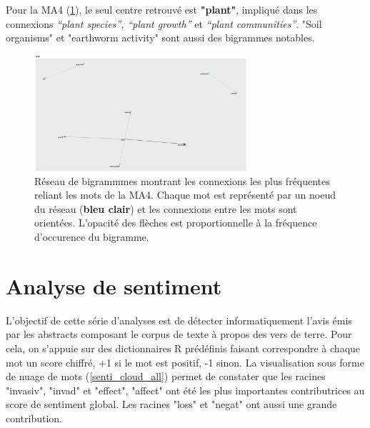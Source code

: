 \documentclass{book}
\begin{document}
Pour la MA4 (\cref{network4}), le seul centre retrouvé est \textbf{"plant"}, impliqué dans les connexions \textit{“plant species”, “plant growth”} et \textit{ “plant communities”}. "Soil organisms" et "earthworm activity" sont aussi des bigrammes notables.

\begin{figure}[htb] %
    \begin{center} %
        \includegraphics[width=0.7\textwidth]{network4.png}
        \caption{Réseau de bigrammmes montrant les connexions les plus fréquentes reliant les mots de la MA4. Chaque mot est représenté par un noeud du réseau (\textbf{bleu clair}) et les connexions entre les mots sont orientées. L’opacité des flèches est proportionnelle à la fréquence d’occurence du bigramme.\label{network4}}
    \end{center}  
\end{figure}

\thispagestyle{fancy}

\section{Analyse de sentiment}
\noindent
L'objectif de cette série d'analyses est de détecter informatiquement l'avis émis par les abstracts composant le corpus de texte à propos des vers de terre. Pour cela, on s'appuie sur des dictionnaires R prédéfinis faisant correspondre à chaque mot un score chiffré, +1 si le mot est positif, -1 sinon. La visualisation sous forme de nuage de mots (\cref{senti_cloud_all}) permet de constater que les racines "invasiv", "invad" et "effect", "affect" ont été les plus importantes contributrices au score de sentiment global. Les racines "loss" et "negat" ont aussi une grande contribution.
\end{document}

